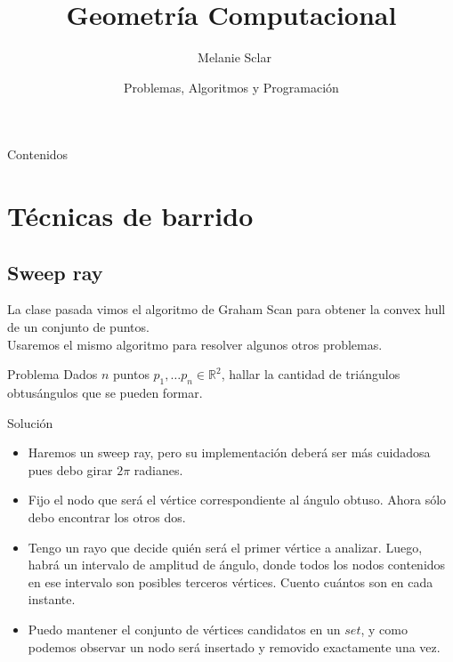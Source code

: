 \documentclass[compress]{beamer}
\title[Geometr\'ia Computacional] %
{Geometr\'ia Computacional}
\author[Melanie Sclar] %
{~Melanie Sclar}
\institute[UBA] %
{
  Facultad de Ciencias Exactas y Naturales\\
  Universidad de Buenos Aires
}
\date[PAP] %
{Problemas, Algoritmos y Programación}
\begin{document}
\begin{frame}
  \titlepage
\end{frame}

\begin{frame}{Contenidos}
  \tableofcontents
\end{frame}

\section{Técnicas de barrido}

\subsection{Sweep ray}
\begin{frame}
La clase pasada vimos el algoritmo de Graham Scan para obtener la convex hull
de un conjunto de puntos. \\

\bigskip
Usaremos el mismo algoritmo para resolver algunos otros problemas.
\end{frame}

\begin{frame}

\begin{block}{Problema}
Dados $n$ puntos $p_1, \ldots p_n \in \mathbb{R}^2$, hallar la 
cantidad de triángulos obtusángulos que se pueden formar.
\end{block}

\end{frame}

\begin{frame}{Solución}
\begin{itemize}
\item Haremos un sweep ray, pero su implementación deberá ser más cuidadosa
pues debo girar $2\pi$ radianes.

\item Fijo el nodo que será el vértice correspondiente al ángulo obtuso. Ahora sólo
debo encontrar los otros dos.

\item Tengo un rayo que decide quién será el primer vértice a analizar. Luego, habrá
un intervalo de amplitud de ángulo, donde todos los nodos contenidos en 
ese intervalo son posibles terceros vértices. Cuento cuántos son en cada
instante.

\item Puedo mantener el conjunto de vértices candidatos en un $set$, y como
podemos observar un nodo será insertado y removido exactamente una vez.
\end{itemize}
\end{frame}
\end{document}
